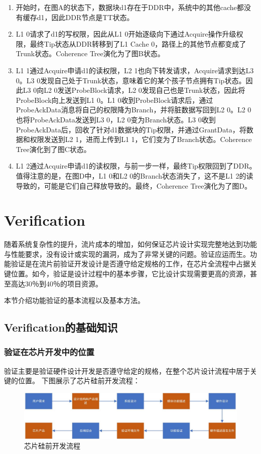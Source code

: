 \begin{center}
\begin{enumerate}
	\item 开始时，在图A的状态下，数据块d1存在于DDR中，系统中的其他cache都没有缓存d1，因此DDR节点是TT状态。
	\item L1 0请求了d1的写权限，因此从L1 0开始逐级向下通过Acquire操作升级权限，最终Tip状态从DDR转移到了L1 Cache 0，路径上的其他节点都变成了Trunk状态。Coherence Tree演化为了图B状态。
	\item L1 1通过Acquire申请d1的读权限，L2 1也向下转发请求，Acquire请求到达L3 0。L3 0发现自己处于Trunk状态，意味着它的某个孩子节点拥有Tip状态。因此L3 0向L2 0发送ProbeBlock请求，L2 0发现自己也是Trunk状态，因此将ProbeBlock向上发送到L1 0。L1 0收到ProbeBlock请求后，通过ProbeAckData消息将自己的权限降为Branch，并将脏数据写回到L2 0。L2 0也将ProbeAckData发送到L3 0，L2 0变为Branch状态。L3 0收到ProbeAckData后，回收了针对d1数据块的Tip权限，并通过GrantData，将数据和权限发送到L2 1，进而上传到L1 1，它们变为了Branch状态。Coherence Tree演化到了图C状态。
	\item L1 2通过Acquire申请d1的读权限，与前一步一样，最终Tip权限回到了DDR。值得注意的是，在图D中，L1 0和L2 0的Branch状态消失了，这不是L1 2的读导致的，可能是它们自己释放导致的。最终，Coherence Tree演化为了图D。
\end{enumerate}

\section{Verification}

随着系统复杂性的提升，流片成本的增加，如何保证芯片设计实现完整地达到功能与性能要求，没有设计或实现的漏洞，成为了非常关键的问题。验证应运而生。功能验证是在流片前验证开发设计是否遵守给定规格的工作，在芯片全流程中占据关键位置。如今，验证是设计过程中的基本步骤，它比设计实现需要更高的资源，甚至高达30％到40％的项目资源。

本节介绍功能验证的基本流程以及基本方法。

\subsection{Verification的基础知识}

\subsubsection{验证在芯片开发中的位置}

验证主要是验证硬件设计开发是否遵守给定的规格，在整个芯片设计流程中居于关键的位置。
下图展示了芯片硅前开发流程：
\begin{figure}[H] %
\centering %
\includegraphics[width=\textwidth]{Img/芯片硅前开发流程.jpg} %
\caption{芯片硅前开发流程} %
\label{芯片硅前开发流程} %
\end{figure}


\end{center}
